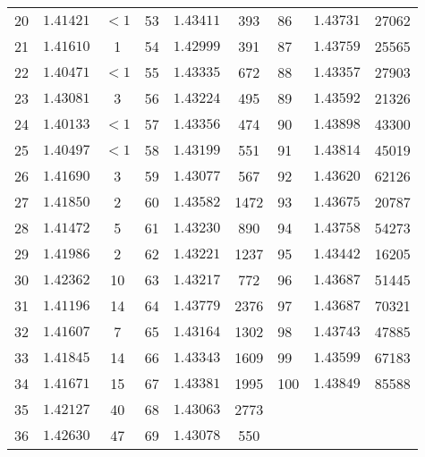 \begin{tabular}{|lcc||lcc||lcc|}
    \num{20} & $1.41421$ & $<1$ & \num{53} & $\mathbf{1.43411}$ & \num{393} & \num{86} & $\mathbf{1.43731}$ & \num{27062} \\
    \num{21} & $1.41610$ & \num{1} & \num{54} & $1.42999$ & \num{391} & \num{87} & $\mathbf{1.43759}$ & \num{25565} \\
    \num{22} & $1.40471$ & $<1$ & \num{55} & $\mathbf{1.43335}$ & \num{672} & \num{88} & $\mathbf{1.43357}$ & \num{27903} \\
    \num{23} & $1.43081$ & \num{3} & \num{56} & $\mathbf{1.43224}$ & \num{495} & \num{89} & $\mathbf{1.43592}$ & \num{21326} \\
    \num{24} & $1.40133$ & $<1$ & \num{57} & $\mathbf{1.43356}$ & \num{474} & \num{90} & $\mathbf{1.43898}$ & \num{43300} \\
    \num{25} & $1.40497$ & $<1$ & \num{58} & $\mathbf{1.43199}$ & \num{551} & \num{91} & $\mathbf{1.43814}$ & \num{45019} \\
    \num{26} & $1.41690$ & \num{3} & \num{59} & $1.43077$ & \num{567} & \num{92} & $\mathbf{1.43620}$ & \num{62126} \\
    \num{27} & $1.41850$ & \num{2} & \num{60} & $\mathbf{1.43582}$ & \num{1472} & \num{93} & $\mathbf{1.43675}$ & \num{20787} \\
    \num{28} & $1.41472$ & \num{5} & \num{61} & $\mathbf{1.43230}$ & \num{890} & \num{94} & $\mathbf{1.43758}$ & \num{54273} \\
    \num{29} & $1.41986$ & \num{2} & \num{62} & $\mathbf{1.43221}$ & \num{1237} & \num{95} & $\mathbf{1.43442}$ & \num{16205} \\
    \num{30} & $1.42362$ & \num{10} & \num{63} & $\mathbf{1.43217}$ & \num{772} & \num{96} & $\mathbf{1.43687}$ & \num{51445} \\
    \num{31} & $1.41196$ & \num{14} & \num{64} & $\mathbf{1.43779}$ & \num{2376} & \num{97} & $\mathbf{1.43687}$ & \num{70321} \\
    \num{32} & $1.41607$ & \num{7} & \num{65} & $\mathbf{1.43164}$ & \num{1302} & \num{98} & $\mathbf{1.43743}$ & \num{47885} \\
    \num{33} & $1.41845$ & \num{14} & \num{66} & $\mathbf{1.43343}$ & \num{1609} & \num{99} & $\mathbf{1.43599}$ & \num{67183} \\
    \num{34} & $1.41671$ & \num{15} & \num{67} & $\mathbf{1.43381}$ & \num{1995} & \num{100} & $\mathbf{1.43849}$ & \num{85588} \\
    \num{35} & $1.42127$ & \num{40} & \num{68} & $1.43063$ & \num{2773} &  &  &  \\
    \num{36} & $1.42630$ & \num{47} & \num{69} & $1.43078$ & \num{550} &  &  &  \\
    \hline
\end{tabular}